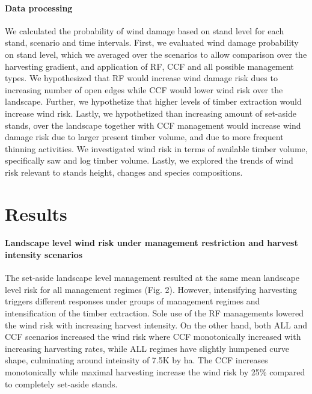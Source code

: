 \documentclass[]{elsarticle} %
\begin{document}
\paragraph{Data processing}\label{data-processing}

We calculated the probability of wind damage based on stand level for
each stand, scenario and time intervals. First, we evaluated wind damage
probability on stand level, which we averaged over the scenarios to
allow comparison over the harvesting gradient, and application of RF,
CCF and all possible management types. We hypothesized that RF would
increase wind damage risk dues to increasing number of open edges while
CCF would lower wind risk over the landscape. Further, we hypothetize
that higher levels of timber extraction would increase wind risk.
Lastly, we hypothetized than increasing amount of set-aside stands, over
the landscape together with CCF management would increase wind damage
risk due to larger present timber volume, and due to more frequent
thinning activities. We investigated wind risk in terms of available
timber volume, specifically saw and log timber volume. Lastly, we
explored the trends of wind risk relevant to stands height, changes and
species compositions.

\section{Results}\label{results}

\paragraph{Landscape level wind risk under management restriction and
harvest intensity
scenarios}\label{landscape-level-wind-risk-under-management-restriction-and-harvest-intensity-scenarios}

The set-aside landscape level management resulted at the same mean
landscape level risk for all management regimes (Fig. 2). However,
intensifying harvesting triggers different responses under groups of
management regimes and intensification of the timber extraction. Sole
use of the RF managements lowered the wind risk with increasing harvest
intensity. On the other hand, both ALL and CCF scenarios increased the
wind risk where CCF monotonically increased with increasing harvesting
rates, while ALL regimes have slightly humpened curve shape, culminating
around inteinsity of 7.5K by ha. The CCF increases monotonically while
maximal harvesting increase the wind risk by 25\% compared to completely
set-aside stands.
\end{document}
